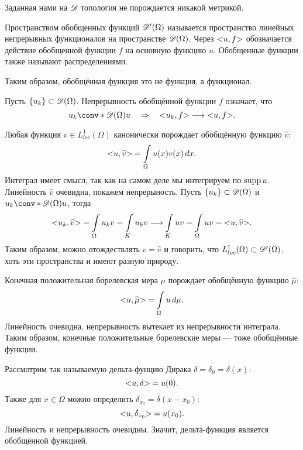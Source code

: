 \begin{note} Заданная нами на $\mathscr{D}$ топология не порождается никакой метрикой. 
\end{note}

\begin{definition}
Пространством обобщенных функций $\mathscr{D}'(\Omega)$ называется пространство линейных непрерывных функционалов на пространстве $\mathscr{D}(\Omega)$. Через $\action{u,f}$ обозначается действие обобщенной функции $f$ на основную функцию $u$. Обобщенные функции также называют распределениями.
\end{definition}

\begin{note} Таким образом, обобщённая функция это не функция, а функционал.
\end{note}

\begin{note} Пусть $\left\{ u_k \right\} \subset \mathscr{D}(\Omega)$. Непрерывность обобщённой функции $f$ означает, что
$$ u_k \conv* {\beauD(\Omega)} {} u \quad \Rightarrow \quad \action{u_k, f} \longrightarrow \action{u, f}.$$
\end{note}

\begin{example} Любая функция $v \in L_{loc}^1 (\Omega)$ канонически порождает обобщённую функцию $\widehat{v}$:
$$ \action{u, \widehat{v}} = \int \limits_\Omega u(x) v(x) \, dx.$$
Интеграл имеет смысл, так как на самом деле мы интегрируем по $\operatorname{supp} u$. Линейность $\widehat{v}$ очевидна, покажем непрерыность. Пусть $\left\{ u_k \right\} \subset \mathscr{D}(\Omega)$ и $ u_k \conv*{\beauD(\Omega)}{} u$, тогда
$$ \action{u_k, \widehat{v}} = \int \limits_\Omega u_k v = \int \limits_K u_k v \longrightarrow \int \limits_K uv = \int \limits_\Omega uv = \action{u, \widehat{v}}.$$
Таким образом, можно отождествлять $v = \widehat{v}$ и говорить, что $L_{loc}^1(\Omega) \subset \mathscr{D}' (\Omega)$, хоть эти пространства и имеют разную природу.
\end{example}

\begin{example}Конечная положительная борелевская мера $\mu$ порождает обобщённую функцию $\widehat{\mu}$:
$$\action{u, \widehat{\mu}} = \int \limits_\Omega u \, d\mu.$$
Линейность очевидна, непрерывность вытекает из непрерывности интеграла. Таким образом, конечные положительные борелевские меры --- тоже обобщённые функции.
\end{example}

\begin{example}Рассмотрим так называемую дельта-фунцию Дирака $\delta = \delta_0 = \delta(x)$:
$$ \action{u, \delta} = u(0).$$
Также для $x \in \Omega$ можно определить $\delta_{x_0} = \delta (x - x_0)$:
$$\action{u, \delta_{x_0}} = u(x_0).$$
Линейность и непрерывность очевидны. Значит, дельта-функция является обобщённой функцией.
\end{example}

